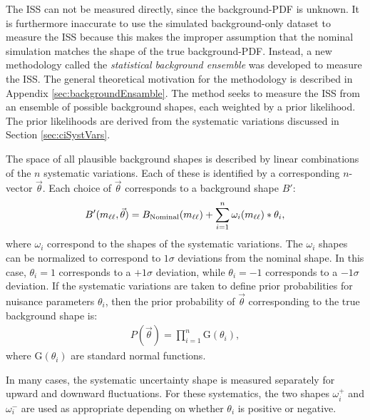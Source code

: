 The ISS can not be measured directly, since the background-PDF is unknown.
It is furthermore inaccurate to use the simulated background-only dataset to measure the ISS because this makes the improper assumption that the nominal simulation matches the shape of the true background-PDF.
Instead, a new methodology called the \emph{statistical background ensemble} was developed to measure the ISS.
The general theoretical motivation for the methodology is described in Appendix \ref{sec:backgroundEnsamble}.
The method seeks to measure the ISS from an ensemble of possible background shapes, each weighted by a prior likelihood.
The prior likelihoods are derived from the systematic variations discussed in Section \ref{sec:ciSystVars}.

The space of all plausible background shapes is described by linear combinations of the $n$ systematic variations.
Each of these is identified by a corresponding $n$-vector $\vec{\theta}$.
Each choice of $\vec{\theta}$ corresponds to a background shape $B'$:
\begin{equation}\begin{split}
    B'(m_{\ell\ell},\vec{\theta}) = B_\text{Nominal}(m_{\ell\ell}) + \sum_{i=1}^n \omega_i(m_{\ell\ell})*\theta_i,
\end{split}\end{equation} 
where $\omega_i$ correspond to the shapes of the systematic variations.
The $\omega_i$ shapes can be normalized to correspond to $1\sigma$ deviations from the nominal shape.
In this case, $\theta_i=1$ corresponds to a $+1\sigma$ deviation, while $\theta_i=-1$ corresponds to a $-1\sigma$ deviation.
If the systematic variations are taken to define prior probabilities for nuisance parameters $\theta_i$, then the prior probability of $\vec{\theta}$ corresponding to the true background shape is:
\begin{equation}\begin{split}
    P(\vec{\theta})=\prod_{i=1}^n \text{G}(\theta_i),
\end{split}\end{equation} 
where $\text{G}(\theta_i)$ are standard normal functions.

In many cases, the systematic uncertainty shape is measured separately for upward and downward fluctuations.
For these systematics, the two shapes $\omega^+_i$ and $\omega^-_i$ are used as appropriate depending on whether $\theta_i$ is positive or negative.

